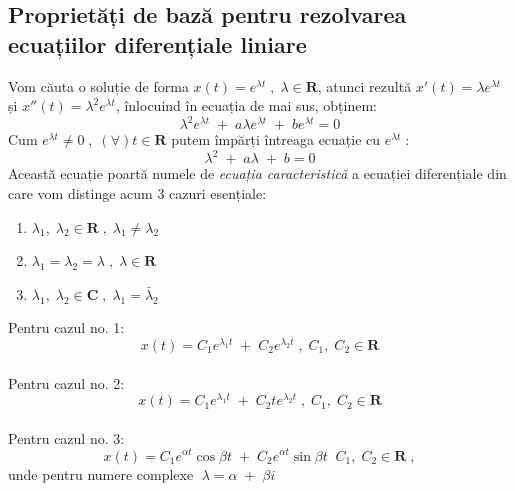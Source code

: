 \documentclass[12pt, a4paper]{article}
\begin{document}
\subsection{Proprietăți de bază pentru rezolvarea ecuațiilor diferențiale liniare}
\hspace{0.4cm}Vom căuta o soluție de forma $x(t) = e^{\lambda t}\;,\;\lambda \in \mathbf{R}$, atunci rezultă $x'(t) = \lambda e^{\lambda t}$ și $x''(t) = \lambda ^2e^{\lambda t}$, înlocuind în ecuația de mai sus, obținem:
$$\lambda^2e^{\lambda t}\;+\;a\lambda e^{\lambda t}\;+\;be^{\lambda t} = 0$$
\hspace{0.4cm}Cum $e^{\lambda t} \neq 0\; ,\;(\forall)t\in\mathbf{R}$ putem împărți întreaga ecuație cu $e^{\lambda t}\;$:
$$\lambda^2\;+\;a\lambda\;+\;b=0$$
\hspace{0.4cm}Această ecuație poartă numele de \emph{ecuația caracteristică} a ecuației diferențiale din care vom distinge acum 3 cazuri esențiale:
\begin{enumerate}
    \item $\lambda_1,\;\lambda_2\in\mathbf{R}\;,\;\lambda_1\neq\lambda_2$
    \item $\lambda_1 = \lambda_2 = \lambda\;,\;\lambda\in\mathbf{R}$
    \item $\lambda_1,\;\lambda_2\in\mathbf{C}\;,\;\lambda_1 = \bar{\lambda}_2$
\end{enumerate}
Pentru cazul no. 1: $$x(t) = C_1e^{\lambda_1t}\;+\;C_2e^{\lambda_2t}\;,\;C_1,\;C_2\in\mathbf{R}$$\\
Pentru cazul no. 2: $$x(t) = C_1e^{\lambda_1t}\;+\;C_2te^{\lambda_2t}\;,\;C_1,\;C_2\in\mathbf{R}$$\\
Pentru cazul no. 3: $$x(t) = C_1e^{\alpha t}\cos{\beta t}\;+\;C_2e^{\alpha t}\sin{\beta t}\;\;C_1, \;C_2\in\mathbf{R}\;,$$\hspace{2.4cm} unde pentru numere complexe $\;\lambda = \alpha\;+\;\beta i$
\newpage
\end{document}

